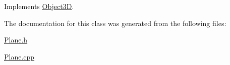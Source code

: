 Implements \hyperlink{classObject3D_a58f07cf2b37c5b6a1c796cd7a939f91b}{Object3\+D}.



The documentation for this class was generated from the following files\+:\begin{DoxyCompactItemize}
\item 
\hyperlink{Plane_8h}{Plane.\+h}\item 
\hyperlink{Plane_8cpp}{Plane.\+cpp}\end{DoxyCompactItemize}
